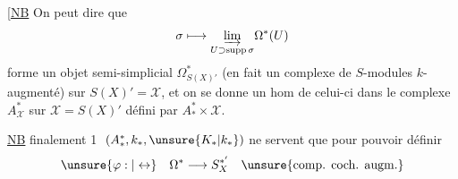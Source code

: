 [\uline{NB} On peut dire que
\[
\sigma\longmapsto\underset{U\supset\operatorname{supp}\sigma}{\varinjlim}\Omega^*(U)
\]
forme un  objet semi-simplicial
$\Omega^*_{S(X)'}$ (en fait un complexe de $S$-modules
$k$-augmenté) sur $S(X)'=\mathcal X$,
et on se donne un hom de celui-ci dans le complexe 
$A^*_{\mathcal X}$ sur $\mathcal X=S(X)'$ défini par
$A_*^*\times\mathcal X$.


\uline{NB} finalement \textcircled{1} $(A_*^*,k_*,\unsure{K_*|k_*})$
 ne servent que pour pouvoir définir
\[
\unsure{\varphi:|\leftrightarrow}\quad\Omega^*\longrightarrow S_X^{*'}
\quad\unsure{\text{comp. coch. augm.}}
\]
